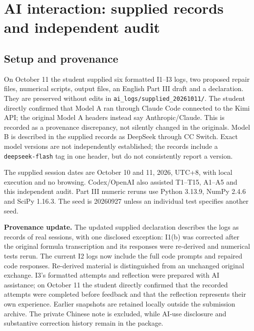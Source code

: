 \section{AI interaction: supplied records and independent audit}
\subsection*{Setup and provenance}
On October 11 the student supplied six formatted I1--I3 logs, two proposed repair files, numerical scripts, output files, an English Part III draft and a declaration. They are preserved without edits in \texttt{ai\_logs/supplied\_20261011/}. The student directly confirmed that Model A ran through Claude Code connected to the Kimi API; the original Model A headers instead say Anthropic/Claude. This is recorded as a provenance discrepancy, not silently changed in the originals. Model B is described in the supplied records as DeepSeek through CC Switch. Exact model versions are not independently established; the records include a \texttt{deepseek-flash} tag in one header, but do not consistently report a version.

The supplied session dates are October 10 and 11, 2026, UTC+8, with local execution and no browsing. Codex/OpenAI also assisted T1--T15, A1--A5 and this independent audit. Part III numeric reruns use Python 3.13.9, NumPy 2.4.6 and SciPy 1.16.3. The seed is 20260927 unless an individual test specifies another seed.

\textbf{Provenance update.} The updated supplied declaration describes the logs as records of real sessions, with one disclosed exception: I1(b) was corrected after the original formula transcription and its responses were re-derived and numerical tests rerun. The current I2 logs now include the full code prompts and repaired code responses. Re-derived material is distinguished from an unchanged original exchange. I3's formatted attempts and reflection were prepared with AI assistance; on October 11 the student directly confirmed that the recorded attempts were completed before feedback and that the reflection represents their own experience. Earlier snapshots are retained locally outside the submission archive. The private Chinese note is excluded, while AI-use disclosure and substantive correction history remain in the package.

